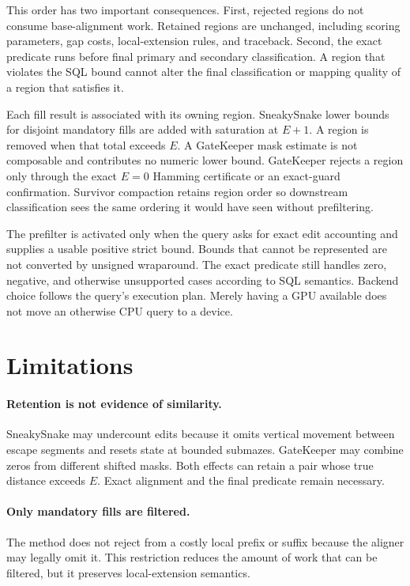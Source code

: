 This order has two important consequences. First, rejected regions do not
consume base-alignment work. Retained regions are unchanged, including scoring
parameters, gap costs, local-extension rules, and traceback. Second, the exact
predicate runs before final primary and secondary classification. A region that
violates the SQL bound cannot alter the final classification or mapping quality
of a region that satisfies it.

Each fill result is associated with its owning region. SneakySnake lower bounds
for disjoint mandatory fills are added with saturation at \(E+1\). A region is
removed when that total exceeds \(E\). A GateKeeper mask estimate is not
composable and contributes no numeric lower bound. GateKeeper rejects a region
only through the exact \(E=0\) Hamming certificate or an exact-guard
confirmation. Survivor compaction retains region order so downstream
classification sees the same ordering it would have seen without
prefiltering.

The prefilter is activated only when the query asks for exact edit accounting
and supplies a usable positive strict bound. Bounds that cannot be represented
are not converted by unsigned wraparound. The exact predicate still handles
zero, negative, and otherwise unsupported cases according to SQL semantics.
Backend choice follows the query's execution plan. Merely having a GPU
available does not move an otherwise CPU query to a device.

\section{Limitations}
\label{sec:prefilter-limitations}

\paragraph{Retention is not evidence of similarity.}
SneakySnake may undercount edits because it omits vertical movement between
escape segments and resets state at bounded submazes. GateKeeper may combine
zeros from different shifted masks. Both effects can retain a pair whose true
distance exceeds \(E\). Exact alignment and the final predicate remain
necessary.

\paragraph{Only mandatory fills are filtered.}
The method does not reject from a costly local prefix or suffix because the
aligner may legally omit it. This restriction reduces the amount of work that
can be filtered, but it preserves local-extension semantics.

